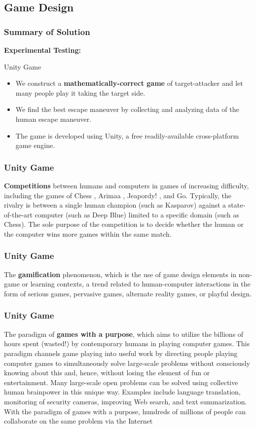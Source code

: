 \documentclass{beamer}
\begin{document}
\subsection{Game Design}
\begin{frame}
\frametitle{Summary of Solution}
\textbf{Experimental Testing:}
\begin{alertblock}{Unity Game}
	\begin{itemize}
		\item We construct a \textbf{mathematically-correct game} of target-attacker and let many people play it taking the target side. 
		\item We find the best escape maneuver by collecting and analyzing data of the human escape maneuver. 
		\item The game is developed using Unity, a free readily-available cross-platform game engine.
	\end{itemize}
\end{alertblock}
\end{frame}
\begin{frame}
\frametitle{Unity Game}
\textbf{Competitions} between humans and computers in games of increasing difficulty, including the games of Chess , Arimaa , Jeapordy! , and Go. Typically, the rivalry is between a single human champion (such as Kasparov) against a state-of-the-art computer (such as Deep Blue) limited to a specific domain (such as Chess). The sole purpose of the competition is to decide whether the human or the computer wins more games within the same match.
\end{frame}
\begin{frame}
\frametitle{Unity Game}
The \textbf{gamification} phenomenon, which is the use of game design elements in non-game or learning contexts, a trend related to human-computer interactions in the form of serious games, pervasive games, alternate reality games, or playful design.
\end{frame}
\begin{frame}
\frametitle{Unity Game}
The paradigm of \textbf{games with a purpose}, which aims to utilize the billions of hours spent (wasted!) by contemporary humans in playing computer games. This paradigm channels game playing into useful work by directing people playing computer games to simultaneously solve large-scale problems without consciously knowing about this and, hence, without losing the element of fun or entertainment. Many large-scale open problems can be solved using collective human brainpower in this unique way. Examples include language translation, monitoring of security cameras, improving Web search, and text summarization. With the paradigm of games with a purpose, hundreds of millions of people can collaborate on the same problem via the Internet
\end{frame}
\end{document}

